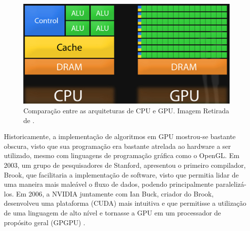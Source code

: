 \begin{figure}[H]
 	\centering
 	\includegraphics[scale=0.85]{./Resources/cpu_gpu.jpg}
 	\caption{Comparação entre as arquiteturas de CPU e GPU. Imagem Retirada de \cite{CUDAPython}.}
 	\label{cpu_gpu}
\end{figure}


Historicamente, a implementação de algoritmos em GPU mostrou-se bastante obscura, visto que sua programação era bastante atrelada ao hardware a ser utilizado, mesmo com linguagens de programação gráfica como o OpenGL. Em 2003, um grupo de pesquisadores de Stanford, apresentou o primeiro compilador, Brook, que facilitaria a implementação de software, visto que permitia lidar de uma maneira mais maleável o fluxo de dados, podendo principalmente paralelizá-los. Em 2006, a NVIDIA juntamente com Ian Buck, criador do Brook, desenvolveu uma plataforma (CUDA) mais intuitiva e que permitisse a utilização de uma linguagem de alto nível e tornasse a GPU em um processador de propósito geral (GPGPU) \cite{NVIDIA}.
